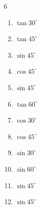 \begin{multicols}{6}
\begin{enumerate}
  \item $\displaystyle \tan{30^\circ}$


  \item $\displaystyle \tan{45^\circ}$

        \phantom{$\displaystyle =1$}

  \item $\displaystyle \sin{45^\circ}$


  \item $\displaystyle \cos{45^\circ}$


  \item $\displaystyle \sin{45^\circ}$


  \item $\displaystyle \tan{60^\circ}$


  \item $\displaystyle \cos{30^\circ}$


  \item $\displaystyle \cos{45^\circ}$


  \item $\displaystyle \sin{30^\circ}$


\columnbreak %

  \item $\displaystyle \sin{60^\circ}$


  \item $\displaystyle \sin{45^\circ}$


  \item $\displaystyle \sin{45^\circ}$



\end{enumerate}
\end{multicols}
